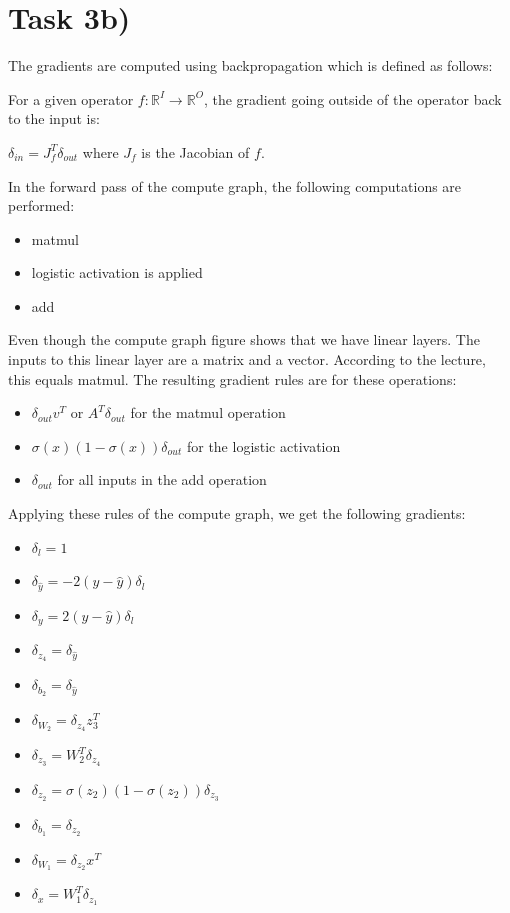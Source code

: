 \documentclass[a4paper,oneside,bibliography=totoc]{scrartcl}
\begin{document}
\section*{Task 3b)}
\begin{answer}[19cm]
  The gradients are computed using backpropagation which is defined as follows:

  For a given operator $f: \mathbb{R}^I \to \mathbb{R}^O$, the gradient going outside of the operator back to the input is:
  \begin{center}
    $\delta_{in} = J_{f}^T \delta_{out}$ where $J_{f}$ is the Jacobian of $f$.
  \end{center}
  In the forward pass of the compute graph, the following computations are performed:
  \begin{itemize}
    \item matmul
    \item logistic activation is applied
    \item add 
  \end{itemize}
  Even though the compute graph figure shows that we have linear layers. The inputs to this linear layer are a matrix and a vector. According to the lecture, this equals
  matmul.
  The resulting gradient rules are for these operations:
  \begin{itemize}
    \item $\delta_{out}v^T$ or $A^T\delta_{out}$ for the matmul operation
    \item $\sigma(x)(1-\sigma(x))\delta_{out}$ for the logistic activation
    \item $\delta_{out}$ for all inputs in the add operation
  \end{itemize}
  Applying these rules of the compute graph, we get the following gradients:
  \begin{itemize}
    \item $\delta_{l} = 1$
    \item $\delta_{\hat{y}} = -2(y-\hat{y})\delta_{l}$
    \item $\delta_{y} = 2(y-\hat{y})\delta_{l}$
    \item $\delta_{z_{4}} = \delta_{\hat{y}}$
    \item $\delta_{b_{2}} = \delta_{\hat{y}}$
    \item $\delta_{W_{2}} = \delta_{z_{4}}z_{3}^T$
    \item $\delta_{z_{3}} = W_{2}^T\delta_{z_{4}}$
    \item $\delta_{z_{2}} = \sigma(z_{2})(1-\sigma(z_{2}))\delta_{z_{3}}$
    \item $\delta_{b_{1}} = \delta_{z_{2}}$
    \item $\delta_{W_{1}} = \delta_{z_{2}}x^T$
    \item $\delta_{x} = W_{1}^T\delta_{z_{1}}$
  \end{itemize}
\end{answer}

\newpage

\end{document}
